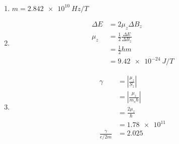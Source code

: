 \documentclass{article}
\begin{document}
\setcounter{subsubsection}{66}
\subsubsection{}

\begin{enumerate}
  \item $m = \qty{2.842e10}{Hz/T}$

  \item

        \begin{align*}
          \Delta E & = 2 \mu_z \Delta B_z                      \\
          \mu_z    & = \frac{1}{2} \frac{\Delta E}{\Delta B_z} \\
                   & = \frac{1}{2} h m                         \\
                   & = \qty{9.42e-24}{J/T}
        \end{align*}

  \item

        \begin{align*}
          \gamma                 & = \left| \frac{\mu_z}{S_z} \right|       \\
                                 & = \left| \frac{\mu_z}{m_s \hbar} \right| \\
                                 & = \frac{2 \mu_z}{\hbar}                  \\
                                 & = \num{1.78e11}                          \\
          \frac{\gamma}{e / 2 m} & = 2.025
        \end{align*}
\end{enumerate}

\setcounter{subsubsection}{68}
\subsubsection{}
\end{document}
